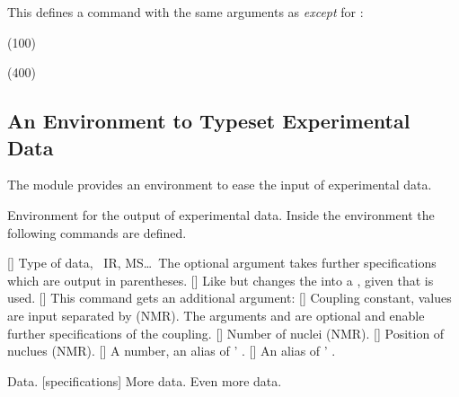 \documentclass{chemmacros-manual}
\begin{document}
This defines a command with the same arguments as  \emph{except} for
:
\begin{example}
  \NewChemNMR{}%
  \NewChemNMR{}%
  \CNMR*(100) \par
  \HNMR*(400)
\end{example}

\subsection{An Environment to Typeset Experimental Data}

The  module provides an environment to ease the input
of experimental data.
\begin{environments}
    Environment for the output of experimental data.  Inside the environment
    the following commands are defined.
\end{environments}
\begin{commands}
  []
    Type of data, \eg\ IR, MS\ldots\  The optional argument takes further
    specifications which are output in parentheses.
  [\sarg{}]
    Like  but changes the \code{=} into a \code{:}, given that
     is used.
  []
    This command gets an additional argument:
     
  []
    Coupling constant, values are input separated by \code{;} (NMR).  The
    arguments  and  are optional
    and enable further specifications of the coupling.
  \command{\#}[]
    Number of nuclei (NMR).
  []
    Position of nuclues (NMR).
  []
    A number, an alias of ' .
  []
    An alias of ' .
\end{commands}

\begin{example}
  \begin{experimental}
     Data.
    [specifications] More data.
     Even more data.
  \end{experimental}
\end{example}
\end{document}
